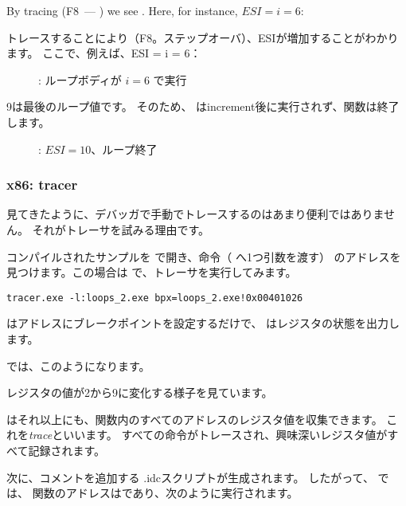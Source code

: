 By tracing (F8~--- \stepover) we see \ESI 
{}.
Here, for instance, $ESI=i=6$:

トレースすることにより（F8。ステップオーバ）、ESIが増加することがわかります。 ここで、例えば、ESI = i = 6：

\begin{figure}[H]
\centering
{}
\caption{\olly: ループボディが $i=6$ で実行}
\label{fig:loops_olly_2}
\end{figure}

9は最後のループ値です。
そのため、 \JL は\gls{increment}後に実行されず、関数は終了します。

\begin{figure}[H]
\centering
{}
\caption{\olly: $ESI=10$、ループ終了}
\label{fig:loops_olly_3}
\end{figure}

\subsubsection{x86: tracer}

見てきたように、デバッガで手動でトレースするのはあまり便利ではありません。 
それがトレーサを試みる理由です。

コンパイルされたサンプルを \IDA で開き、命令（ \ttf へ1つ引数を渡す）
のアドレスを見つけます。この場合は  で、トレーサを実行してみます。

\begin{lstlisting}
tracer.exe -l:loops_2.exe bpx=loops_2.exe!0x00401026
\end{lstlisting}

 はアドレスにブレークポイントを設定するだけで、 \tracer はレジスタの状態を出力します。

では、このようになります。



\ESI レジスタの値が2から9に変化する様子を見ています。

\tracer はそれ以上にも、関数内のすべてのアドレスのレジスタ値を収集できます。 
これを\emph{trace}といいます。 
すべての命令がトレースされ、興味深いレジスタ値がすべて記録されます。

次に、コメントを追加する \IDA .idcスクリプトが生成されます。 
したがって、 \IDA では、 \main 関数のアドレスはであり、次のように実行されます。

